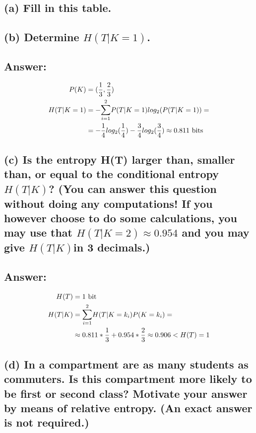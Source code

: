 \documentclass[11px]{article}
\begin{document}
\subsection*{\normalfont (a) Fill in this table.}

\subsection*{\normalfont (b) Determine \(H(T|K = 1)\).}

\subsection*{Answer:}

\begin{equation}
\begin{split}
P(K) & = (\frac{1}{3},\frac{2}{3}) \\
H(T|K = 1) & = -\mathlarger{\sum}_{i=1}^{2} P(T|K = 1)log_2(P(T|K = 1)) = \\
& = -\frac{1}{4}log_2(\frac{1}{4}) - \frac{3}{4}log_2(\frac{3}{4}) \approx 0.811 \text{ bits}
\end{split}    
\end{equation}

\subsection*{\normalfont (c) Is the entropy H(T) larger than, smaller than, or equal to the conditional entropy \(H(T|K)\)? (You can answer this question without doing any computations! If you however choose to do some calculations, you may use that \(H(T|K = 2) \approx 0.954\) and you may give \(H(T|K)\)in 3 decimals.)}

\subsection*{Answer:}

\begin{equation}
\begin{split}
H(T) & = 1 \text{ bit} \\
H(T|K) & = \mathlarger{\sum}_{i=1}^{2} H(T|K = k_i)P(K = k_i) = \\
& \approx 0.811*\frac{1}{3} + 0.954*\frac{2}{3} \approx 0.906 < H(T) = 1
\end{split}    
\end{equation}

\subsection*{\normalfont (d) In a compartment are as many students as commuters. Is this compartment more likely to be first or second class? Motivate your answer by means of relative entropy. (An exact answer is not required.)}
\end{document}
